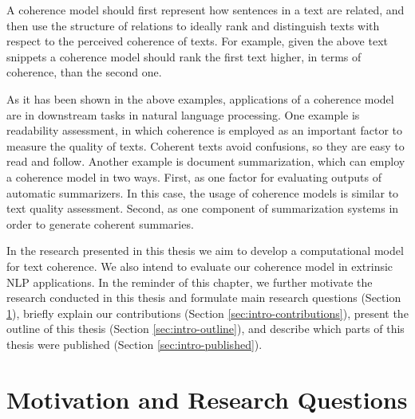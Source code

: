 A coherence model should first represent how sentences in a text are related, and then use the structure of relations to ideally rank and distinguish texts with respect to the perceived coherence of texts. 
For example, given the above text snippets a coherence model should rank the first text higher, in terms of coherence, than the second one. 

As it has been shown in the above examples, applications of a coherence model are in downstream tasks in natural language processing. 
One example is readability assessment, in which coherence is employed as an important factor to measure the quality of texts. 
Coherent texts avoid confusions, so they are easy to read and follow. 
Another example is document summarization, which can employ a coherence model in two ways. 
First, as one factor for evaluating outputs of automatic summarizers. 
In this case, the usage of coherence models is similar to text quality assessment. 
Second, as one component of summarization systems in order to generate coherent summaries. 


In the research presented in this thesis we aim to develop a computational model for text coherence. 
We also intend to evaluate our coherence model in extrinsic NLP applications. 
In the reminder of this chapter, we further motivate the research conducted in this thesis and formulate main research questions (Section \ref{sec:intro-motivation}), briefly explain our contributions (Section \ref{sec:intro-contributions}), present the outline of this thesis (Section \ref{sec:intro-outline}), and describe which parts of this thesis were published (Section \ref{sec:intro-published}). 

\section{Motivation and Research Questions}
\label{sec:intro-motivation}

